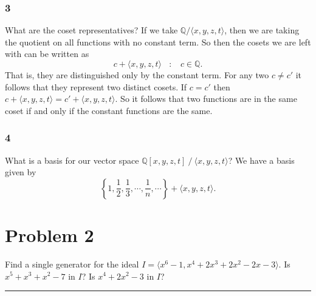 \documentclass{article}
\theoremstyle{definition}
\begin{document}
\subsubsection*{3}
What are the coset representatives?
If we take $\mathbb{Q} / \langle x,y,z,t \rangle$, then we are taking the quotient on 
all functions with no constant term. So then the cosets we are left with can be written as 
\[
    c + \langle x,y,z,t \rangle \ \ \ \ : \ \ \ \ c \in \mathbb{Q}  
.\]
That is, they are distinguished only by the constant term. For any two $c \neq c'$ 
it follows that they represent two distinct cosets. If $c = c'$ then 
$c + \langle x,y,z,t \rangle = c' + \langle x,y,z,t \rangle$.
So it follows that two functions are in the same coset if and only if the constant 
functions are the same.
\subsubsection*{4}
What is a basis for our vector space $\mathbb{Q}[x,y,z,t] \ / \ \langle x,y,z,t \rangle$?
We have a basis given by 
\[
    \left\{1, \frac{1}{2}, \frac{1}{3}, \cdots, \frac{1}{n}, \cdots \right\} + \langle x,y,z,t \rangle
.\]
\section*{Problem 2}
Find a single generator for the ideal $I = \langle x^6 - 1, x^4 + 2x^3 + 2x^2 -2x -3\rangle$.
Is $x^5 + x^3 + x^2 - 7$ in $I$? Is $x^4 + 2x^2 - 3$ in $I$?
\\
\par\noindent\rule{\textwidth}{0.4pt}
\end{document}
